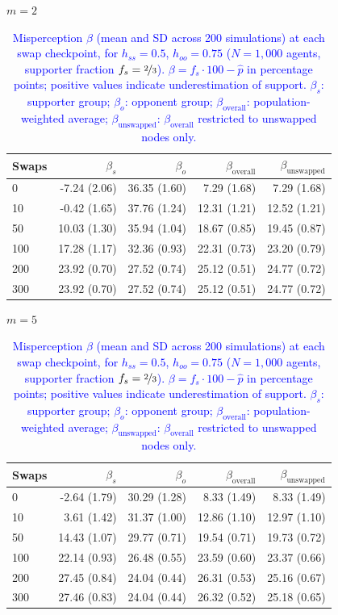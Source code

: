 \begin{table}[H]
\centering
\caption{\textcolor{blue}{Misperception $\beta$ (mean and SD across 200 simulations) at each swap checkpoint, for $h_{ss} = 0.5$, $h_{oo} = 0.75$ ($N = 1{,}000$ agents, supporter fraction $f_s = \nicefrac{2}{3}$). $\beta = f_s \cdot 100 - \hat{p}$ in percentage points; positive values indicate underestimation of support. $\beta_s$: supporter group; $\beta_o$: opponent group; $\beta_{\mathrm{overall}}$: population-weighted average; $\beta_{\mathrm{unswapped}}$: $\beta_{\mathrm{overall}}$ restricted to unswapped nodes only.}}
\label{tab:subset_fs0667_hss500_hoo750}
\par\medskip
\noindent\textit{$m = 2$}\\[2pt]
\begin{tabular}{l rrrr}
\toprule
Swaps & $\beta_s$ & $\beta_o$ & $\beta_{\mathrm{overall}}$ & $\beta_{\mathrm{unswapped}}$ \\
\midrule
0 & -7.24 (2.06) & 36.35 (1.60) & 7.29 (1.68) & 7.29 (1.68) \\
10 & -0.42 (1.65) & 37.76 (1.24) & 12.31 (1.21) & 12.52 (1.21) \\
50 & 10.03 (1.30) & 35.94 (1.04) & 18.67 (0.85) & 19.45 (0.87) \\
100 & 17.28 (1.17) & 32.36 (0.93) & 22.31 (0.73) & 23.20 (0.79) \\
200 & 23.92 (0.70) & 27.52 (0.74) & 25.12 (0.51) & 24.77 (0.72) \\
300 & 23.92 (0.70) & 27.52 (0.74) & 25.12 (0.51) & 24.77 (0.72) \\
\bottomrule
\end{tabular}
\par\medskip
\noindent\textit{$m = 5$}\\[2pt]
\begin{tabular}{l rrrr}
\toprule
Swaps & $\beta_s$ & $\beta_o$ & $\beta_{\mathrm{overall}}$ & $\beta_{\mathrm{unswapped}}$ \\
\midrule
0 & -2.64 (1.79) & 30.29 (1.28) & 8.33 (1.49) & 8.33 (1.49) \\
10 & 3.61 (1.42) & 31.37 (1.00) & 12.86 (1.10) & 12.97 (1.10) \\
50 & 14.43 (1.07) & 29.77 (0.71) & 19.54 (0.71) & 19.73 (0.72) \\
100 & 22.14 (0.93) & 26.48 (0.55) & 23.59 (0.60) & 23.37 (0.66) \\
200 & 27.45 (0.84) & 24.04 (0.44) & 26.31 (0.53) & 25.16 (0.67) \\
300 & 27.46 (0.83) & 24.04 (0.44) & 26.32 (0.52) & 25.18 (0.65) \\

\end{tabular}
\end{table}
